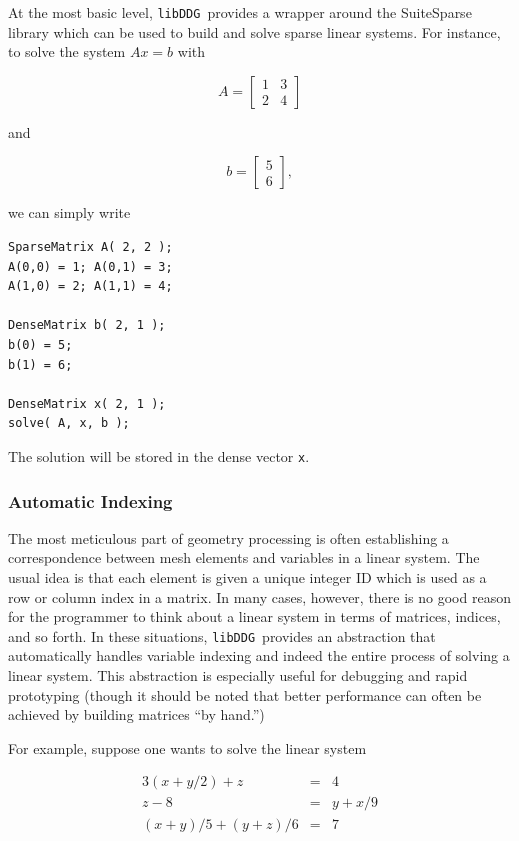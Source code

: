 \documentclass{article}
\newcommand{\libddg}{\texttt{libDDG}\ }
\begin{document}
At the most basic level, \libddg provides a wrapper around the SuiteSparse library which can be used to build and solve sparse linear systems.  For instance, to solve the system \(Ax = b\) with

\[ A = \left[\begin{array}{rr} 1 & 3 \\ 2 & 4 \end{array}\right] \]

and

\[ b = \left[\begin{array}{r} 5 \\ 6 \end{array}\right], \]

we can simply write

\begin{verbatim}
SparseMatrix A( 2, 2 );
A(0,0) = 1; A(0,1) = 3;
A(1,0) = 2; A(1,1) = 4;

DenseMatrix b( 2, 1 );
b(0) = 5;
b(1) = 6;

DenseMatrix x( 2, 1 );
solve( A, x, b );
\end{verbatim}

The solution will be stored in the dense vector \texttt{x}.

\subsubsection{Automatic Indexing}

The most meticulous part of geometry processing is often establishing a correspondence between mesh elements and variables in a linear system.  The usual idea is that each element is given a unique integer ID which is used as a row or column index in a matrix.  In many cases, however, there is no good reason for the programmer to think about a linear system in terms of matrices, indices, and so forth.  In these situations, \libddg provides an abstraction that automatically handles variable indexing and indeed the entire process of solving a linear system.  This abstraction is especially useful for debugging and rapid prototyping (though it should be noted that better performance can often be achieved by building matrices ``by hand.'')
 
For example, suppose one wants to solve the linear system

\[
   \begin{array}{rcl}
        3(x+y/2) + z &=& 4 \\
                 z-8 &=& y+x/9 \\
   (x+y)/5 + (y+z)/6 &=& 7 \\
   \end{array}
\]
\end{document}
